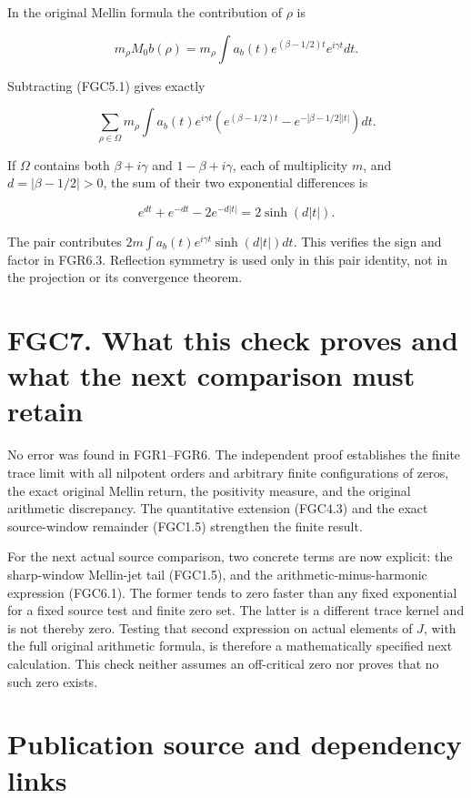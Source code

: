 In the original Mellin formula the contribution of \(\rho\) is

\[
 m_\rho M_0b(\rho)=m_\rho\int a_b(t)
 e^{(\beta-1/2)t}e^{i\gamma t}dt.
\]

Subtracting (FGC5.1) gives exactly

\[
 \sum_{\rho\in\Omega}m_\rho\int a_b(t)e^{i\gamma t}
 \left(e^{(\beta-1/2)t}-e^{-|\beta-1/2||t|}\right)dt.
\tag{FGC6.1}
\]

If \(\Omega\) contains both \(\beta+i\gamma\) and \(1-\beta+i\gamma\),
each of multiplicity \(m\), and \(d=|\beta-1/2|>0\), the sum of their
two exponential differences is

\[
 e^{dt}+e^{-dt}-2e^{-d|t|}=2\sinh(d|t|).
\]

The pair contributes \(2m\int a_b(t)e^{i\gamma t}\sinh(d|t|)dt\). This
verifies the sign and factor in FGR6.3. Reflection symmetry is used only
in this pair identity, not in the projection or its convergence theorem.

\section{FGC7. What this check proves and what the next comparison must
retain}\label{fgc7.-what-this-check-proves-and-what-the-next-comparison-must-retain}

No error was found in FGR1--FGR6. The independent proof establishes the
finite trace limit with all nilpotent orders and arbitrary finite
configurations of zeros, the exact original Mellin return, the
positivity measure, and the original arithmetic discrepancy. The
quantitative extension (FGC4.3) and the exact source-window remainder
(FGC1.5) strengthen the finite result.

For the next actual source comparison, two concrete terms are now
explicit: the sharp-window Mellin-jet tail (FGC1.5), and the
arithmetic-minus-harmonic expression (FGC6.1). The former tends to zero
faster than any fixed exponential for a fixed source test and finite
zero set. The latter is a different trace kernel and is not thereby
zero. Testing that second expression on actual elements of \(J\), with
the full original arithmetic formula, is therefore a mathematically
specified next calculation. This check neither assumes an off-critical
zero nor proves that no such zero exists.

\section{Publication source and dependency
links}\label{publication-source-and-dependency-links-14}

